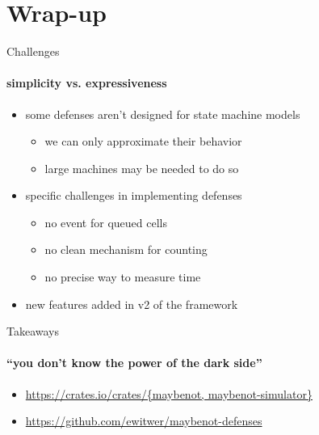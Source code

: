 \documentclass[xcolor=x11names,dvipsnames,aspectratio=169]{beamer}
\begin{document}
\section{Wrap-up}
\begin{frame}{Challenges}
  \framesubtitle{simplicity vs. expressiveness}
  \begin{itemize}
    \item some defenses aren't designed for state machine models
    \begin{itemize}
        \item we can only approximate their behavior
        \item large machines may be needed to do so
    \end{itemize}
    \item specific challenges in implementing defenses
    \begin{itemize}
        \item no event for queued cells
        \item no clean mechanism for counting
        \item no precise way to measure time
    \end{itemize}
    \item new features added in v2 of the framework
  \end{itemize}
\end{frame}

\begin{frame}{Takeaways}
  \framesubtitle{``you don't know the power of the dark side''}
  \begin{itemize}
    \item \url{https://crates.io/crates/{maybenot, maybenot-simulator}}
    \item \url{https://github.com/ewitwer/maybenot-defenses}
  \end{itemize}
\end{frame}

  \backmatter
\end{document}

